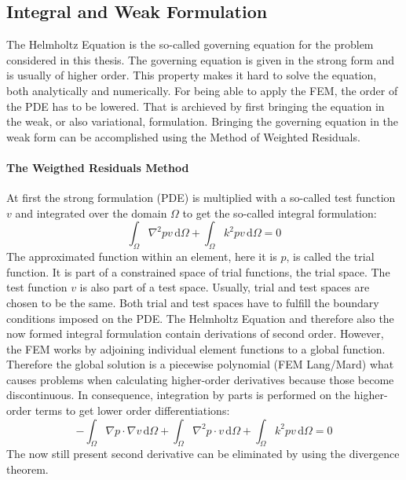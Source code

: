 \documentclass[%
  a4paper,oneside,%
  11pt,%
  smallchapters,
  green,%
  rgb, <cmyk>
  ,]{tubsbook}
\begin{document}
\subsection{Integral and Weak Formulation}
The Helmholtz Equation is the so-called governing equation for the problem considered in this thesis. The governing equation is given in the strong form and is usually of higher order. This property makes it hard to solve the equation, both analytically and numerically. For being able to apply the FEM, the order of the PDE has to be lowered. That is archieved by first bringing the equation in the weak, or also variational, formulation.
Bringing the governing equation in the weak form can be accomplished using the Method of Weighted Residuals. 
\paragraph{The Weigthed Residuals Method}
At first the strong formulation (PDE) is multiplied with a so-called test function $v$ and integrated over the domain $\Omega$ to get the so-called integral formulation:
\begin{equation}
\int_{\Omega} \nabla^2 pv \,\mathrm{d}\Omega + \int_{\Omega} k^2 pv \,\mathrm{d}\Omega = 0
\end{equation}
%
The approximated function within an element, here it is $p$, is called the trial function. It is part of a constrained space of trial functions, the trial space. The test function $v$ is also part of a test space. Usually, trial and test spaces are chosen to be the same. Both trial and test spaces have to fulfill the boundary conditions imposed on the PDE.
The Helmholtz Equation and therefore also the now formed integral formulation contain derivations of second order. However, the FEM works by adjoining individual element functions to a global function. Therefore the global solution is a piecewise polynomial (FEM Lang/Mard) what causes problems when calculating higher-order derivatives because those become discontinuous. In consequence, integration by parts is performed on the higher-order terms to get lower order differentiations:
\begin{equation}
-\int_{\Omega} \nabla p \cdot \nabla v \,\mathrm{d}\Omega + \int_{\Omega} \nabla^2 p \cdot v \,\mathrm{d}\Omega+ \int_{\Omega} k^2 pv \,\mathrm{d}\Omega = 0
\label{eqn:IntByParts}
\end{equation}
The now still present second derivative can be eliminated by using the divergence theorem.
\end{document}
